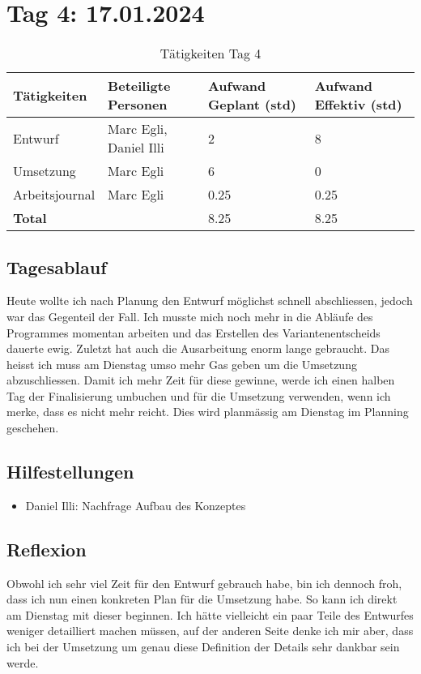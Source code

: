 \section{Tag 4: 17.01.2024}
\begin{table}[H]
    \begin{tabular}{|L{0.4\textwidth}|C{60pt}|C{60pt}|C{60pt}|}
        \hline
        \color{white}Tätigkeiten & \color{white}Beteiligte \color{white}Personen & \color{white}Aufwand Geplant (std) & \color{white}Aufwand Effektiv (std) \\
        \hline
        Entwurf & Marc Egli, Daniel Illi & 2 & 8 \\
        \hline
        Umsetzung & Marc Egli & 6 & 0 \\
        \hline
        Arbeitsjournal & Marc Egli & 0.25 & 0.25 \\
        \textbf{Total} & & 8.25 & 8.25 \\
        \hline
    \end{tabular}
    \caption{Tätigkeiten Tag 4}
\end{table}

\subsection*{Tagesablauf}
Heute wollte ich nach Planung den Entwurf möglichst schnell abschliessen, jedoch war das Gegenteil der Fall.
Ich musste mich noch mehr in die Abläufe des Programmes momentan arbeiten und das Erstellen des Variantenentscheids dauerte
ewig. Zuletzt hat auch die Ausarbeitung enorm lange gebraucht. Das heisst ich muss am Dienstag umso mehr Gas geben um die Umsetzung abzuschliessen.
Damit ich mehr Zeit für diese gewinne, werde ich einen halben Tag der Finalisierung umbuchen und für die Umsetzung verwenden, wenn ich merke, dass
es nicht mehr reicht. Dies wird planmässig am Dienstag im Planning geschehen.

\subsection*{Hilfestellungen}
\begin{itemize}
    \item Daniel Illi: Nachfrage Aufbau des Konzeptes
\end{itemize}

\subsection*{Reflexion}
Obwohl ich sehr viel Zeit für den Entwurf gebrauch habe, bin ich dennoch froh, dass ich nun einen konkreten Plan für die Umsetzung habe.
So kann ich direkt am Dienstag mit dieser beginnen. Ich hätte vielleicht ein paar Teile des Entwurfes weniger detailliert machen müssen, auf der 
anderen Seite denke ich mir aber, dass ich bei der Umsetzung um genau diese Definition der Details sehr dankbar sein werde.

